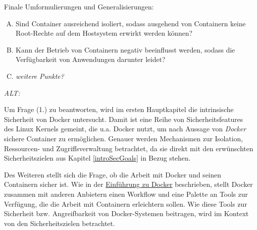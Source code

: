 \documentclass[../main.tex]{subfiles}
\begin{document}
  Finale Umformulierungen und Generalisierungen:

  \begin{enumerate}[(A)]
    \item Sind Container ausreichend isoliert, sodass ausgehend von Containern keine Root-Rechte auf dem Hostsystem erwirkt werden können?
    \item Kann der Betrieb von Containern negativ beeinflusst werden, sodass die Verfügbarkeit von Anwendungen darunter leidet?
    \item \emph{weitere Punkte?}
  \end{enumerate}



  \emph{ALT:}


  Um Frage (1.) zu beantworten, wird im ersten Hauptkapitel die intrinsische Sicherheit von Docker untersucht. Damit ist eine Reihe von Sicherheitsfeatures des Linux Kernels gemeint, die u.a. Docker nutzt, um nach Aussage von \emph{Docker} sichere Container zu ermöglichen. Genauer werden Mechanismen zur Isolation, Ressourcen- und Zugriffsverwaltung betrachtet, da sie direkt mit den erwünschten Sicherheitszielen aus Kapitel \ref{introSecGoals} in Bezug stehen.

  Des Weiteren stellt sich die Frage, ob die Arbeit mit Docker und seinen Containern sicher ist. Wie in der \hyperref[dockerIntro]{Einführung zu Docker} beschrieben, stellt Docker zusammen mit anderen Anbietern einen Workflow und eine Palette an Tools zur Verfügung, die die Arbeit mit Containern erleichtern sollen. Wie diese Tools zur Sicherheit bzw. Angreifbarkeit von Docker-Systemen beitragen, wird im Kontext von den Sicherheitszielen betrachtet.
\end{document}
